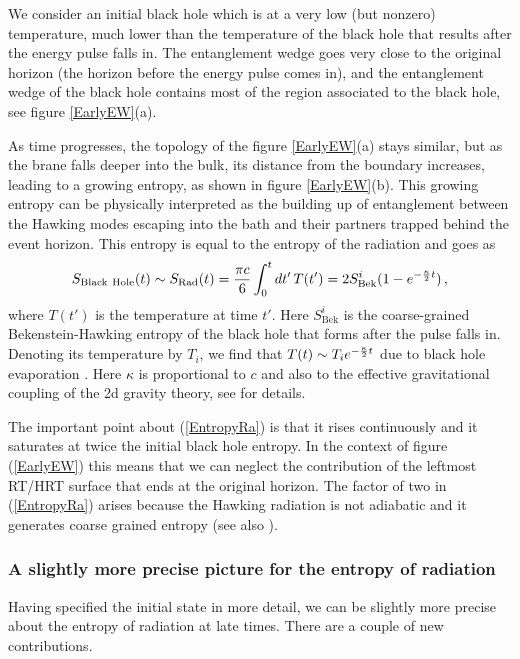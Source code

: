 \documentclass[12pt]{article}
\newcommand{\be}{\begin{equation}}
\newcommand{\ee}{\end{equation}}
\def\la{\label}
\def\nref#1{(\ref{#1})}
\begin{document}
We consider an initial black hole which is at a very low (but nonzero) temperature, much lower than the temperature of the black hole that results after the energy pulse falls in.
The entanglement wedge goes very close to the original horizon (the horizon before the energy pulse comes in), and the entanglement wedge of the black hole contains most of the region associated to the black hole, see figure \ref{EarlyEW}(a).

As time progresses, the topology of the figure \ref{EarlyEW}(a) stays similar, but as the brane falls deeper into the bulk, its distance from the boundary increases, leading to a growing entropy, as shown in figure \ref{EarlyEW}(b).
This growing entropy can be physically interpreted as the building up of entanglement between the Hawking modes escaping into the bath and their partners trapped behind the event horizon.
This entropy is equal to the entropy of the radiation and goes as 
\be 
\la{EntropyRa}
    S_{\rm Black ~Hole}(t) \sim S_{\rm Rad}(t) =  
    \frac{\pi c}{6} \int_0^t dt'\,   T(t') = 2 S^i_{\text{Bek}} ( 1 - e^{-{\kappa \over 2}  t })\, ,
\ee
where $T(t')$ is the temperature at time $t'$. 
Here $S^i_{\text{Bek}}$ is the coarse-grained Bekenstein-Hawking entropy of the black hole that forms after the pulse falls in. 
Denoting its temperature by $T_i$, we find that $T(t) \sim  T_i e^{ - {\kappa \over 2} t} $ due to black hole evaporation \cite{Engelsoy:2016xyb}. 
Here $\kappa$ is proportional to $c$ and also to the effective gravitational coupling of the 2d gravity theory, see \cite{Almheiri:2019psf} for details.
       
The important point about \nref{EntropyRa} is that it rises continuously and it saturates at twice the initial black hole entropy.
In the context of figure \nref{EarlyEW} this means that we can neglect the contribution of the leftmost RT/HRT surface that ends at the original horizon. 
The factor of two in \nref{EntropyRa} arises because the Hawking radiation is not adiabatic and it generates coarse grained entropy \cite{Page:2013dx} (see also \cite{Penington:2019npb}).    

\subsubsection{A slightly more precise picture for the entropy of radiation} 
     
Having specified the initial state in more detail, we can be slightly more precise about the entropy of radiation at late times. 
There are a couple of new contributions.
\end{document}

